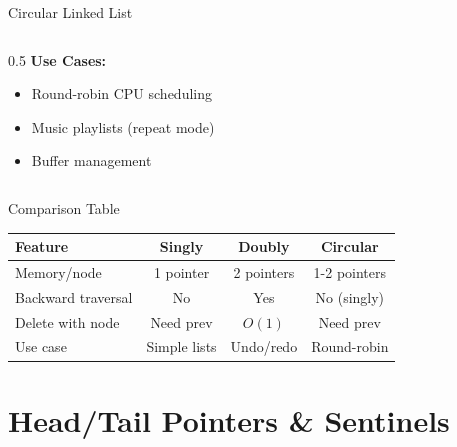 \documentclass[aspectratio=169,xcolor=dvipsnames]{beamer}
\begin{document}
\begin{frame}{Circular Linked List}
\begin{columns}
\begin{column}{0.5\textwidth}
      \vspace{0.3cm}
      \textbf{Use Cases:}
      \begin{itemize}
        \item Round-robin CPU scheduling
        \item Music playlists (repeat mode)
        \item Buffer management
      \end{itemize}
    \end{column}
  \end{columns}
\end{frame}

\begin{frame}{Comparison Table}
  \begin{table}
    \centering
    \begin{tabular}{lccc}
      \hline
      \textbf{Feature} & \textbf{Singly} & \textbf{Doubly} & \textbf{Circular} \\
      \hline
      Memory/node & 1 pointer & 2 pointers & 1-2 pointers \\
      Backward traversal & No & Yes & No (singly) \\
      Delete with node & Need prev & $O(1)$ & Need prev \\
      Use case & Simple lists & Undo/redo & Round-robin \\
      \hline
    \end{tabular}
  \end{table}
\end{frame}

\section{Head/Tail Pointers \& Sentinels}
\end{document}

